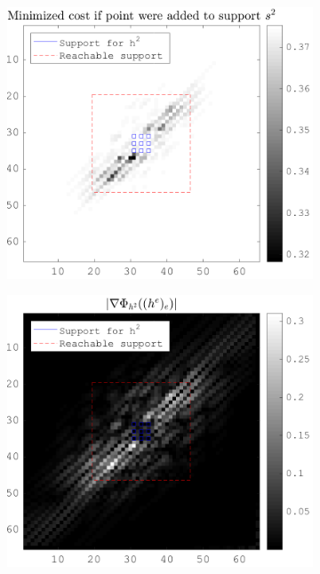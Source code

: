 \begin{figure}[!h]
\begin{subfigure}[b]{0.49\textwidth}
\end{subfigure}
   \begin{subfigure}[b]{0.49\textwidth}\centering
    \includegraphics[width=\textwidth]{figures/xp/xp_128x128_sc2_angl1_K3_S3_node2_objmatrix.png}
    \end{subfigure}
    \begin{subfigure}[b]{0.49\textwidth}\centering
    \includegraphics[width=\textwidth]{figures/xp/xp_128x128_sc2_angl1_K3_S3_node2_partgrad2.png}
    \end{subfigure}
\end{figure}


